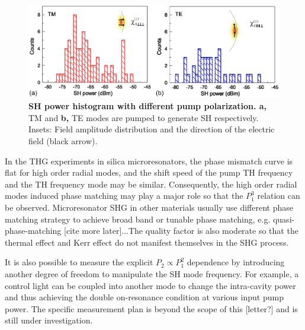\documentclass[a4paper,8pt,hyperref, twocolumn]{article}
\begin{document}
\begin{figure}[!ht]
\includegraphics[width=18cm]{Fig3.eps}
\caption{\textbf{SH power histogram with different pump polarization. a, } TM and \textbf{b,} TE modes are pumped to generate SH respectively. Insets: Field amplitude distribution and the direction of the electric field (black arrow).}
\label{pic:Fig3}
\end{figure}

In the THG experiments in silica microresonators\cite{carmon2007visible, farnesi2014optical}, the phase mismatch curve is flat for high order radial modes, and the shift speed of the pump TH frequency and the TH frequency mode may be similar. Consequently, the high order radial modes induced phase matching may play a major role so that the $P_1^3$ relation can be observed. Microresonator SHG in other materials usually use different phase matching strategy to achieve broad band or tunable phase matching, e.g. quasi-phase-matching [cite more later]...The quality factor is also moderate so that the thermal effect and Kerr effect do not manifest themselves in the SHG process.

It is also possible to measure the explicit $P_2 \propto P_1^2$ dependence by introducing another degree of freedom to manipulate the SH mode frequency. For example, a control light can be coupled into another mode to change the intra-cavity power and thus achieving the double on-resonance condition at various input pump power. The specific measurement plan is beyond the scope of this [letter?] and is still under investigation.





\end{document}

